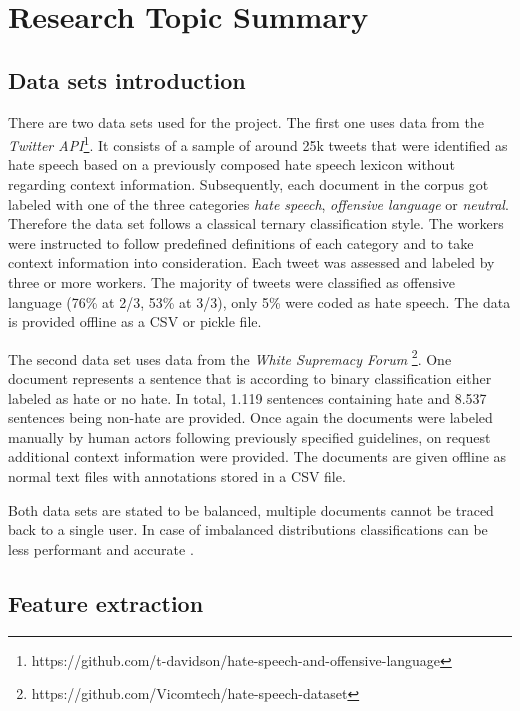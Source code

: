 \section{Research Topic Summary}
\label{section:research}

\subsection{Data sets introduction}

There are two data sets used for the project. The first one \cite{ThomasDavidson.2020} uses data from the \textit{Twitter API}\footnote{https://github.com/t-davidson/hate-speech-and-offensive-language}. It consists of a sample of around 25k tweets that were identified as hate speech based on a previously composed hate speech lexicon without regarding context information. Subsequently, each document in the corpus got labeled with one of the three categories \textit{hate speech}, \textit{offensive language} or \textit{neutral}. Therefore the data set follows a classical ternary clas\-si\-fi\-ca\-tion style. The workers were instructed to follow predefined definitions of each category and to take context information into consideration. Each tweet was assessed and labeled by three or more workers. The majority of tweets were classified as offensive language (76\% at 2/3, 53\% at 3/3), only 5\% were coded as hate speech. The data is provided offline as a CSV or pickle file. 

The second data set uses data from the \textit{White Supremacy Forum} \cite{OnadeGibert.2020}\footnote{https://github.com/Vicomtech/hate-speech-dataset}. One document represents a sentence that is according to binary classification either labeled as hate or no hate. In total, 1.119 sentences containing hate and 8.537 sentences being non-hate are provided. Once again the documents were labeled manually by human actors following previously specified guidelines, on request additional context information were provided. The documents are given offline as normal text files with annotations stored in a CSV file. 

Both data sets are stated to be balanced, multiple documents cannot be traced back to a single user. In case of imbalanced distributions classifications can be less performant and accurate \cite{Oriola.2020}.

\subsection{Feature extraction}

